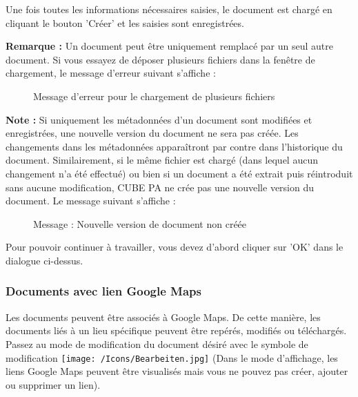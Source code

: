 Une fois toutes les informations nécessaires saisies, le document est chargé en cliquant le bouton 'Créer'  et les saisies sont enregistrées. \newline

\textbf{Remarque :} Un document peut être uniquement remplacé par un seul autre document. Si vous essayez de déposer plusieurs fichiers dans la fenêtre de chargement, le message d'erreur suivant s'affiche :

\begin{figure}[H]
\caption{Message d'erreur pour le chargement de plusieurs fichiers}
\end{figure}

\textbf{Note :} Si uniquement les métadonnées d'un document sont modifiées et enregistrées, une nouvelle version du document ne sera pas créée. Les changements dans les métadonnées apparaîtront par contre dans l'historique du document. Similairement, si le même fichier est chargé (dans lequel aucun changement n'a été effectué) ou bien si un document a été extrait puis réintroduit sans aucune modification, CUBE PA ne crée pas une nouvelle version du document. Le message suivant s'affiche :

\begin{figure}[H]
\caption{Message : Nouvelle version de document non créée}
\end{figure}

Pour pouvoir continuer à travailler, vous devez d'abord cliquer sur 'OK' dans le dialogue ci-dessus.

\subsubsection{Documents avec lien Google Maps}
\label{bkm:Ref442545553}
Les documents peuvent être associés à Google Maps. De cette manière, les documents liés à un lieu spécifique peuvent être repérés, modifiés ou téléchargés. \\
Passez au mode de modification du document désiré avec le symbole de modification \texttt{[image: /Icons/Bearbeiten.jpg]} (Dans le mode d'affichage, les liens Google Maps peuvent être visualisés mais vous ne pouvez pas créer, ajouter ou supprimer un lien).

